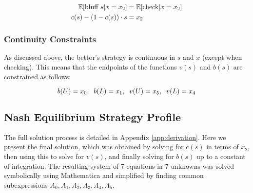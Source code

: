 \documentclass[../../main/main.tex]{subfiles}
\begin{document}
\begin{align}{\label{bluffindiff}}
    \nonumber \mathbb{E}[\text{bluff } s | x=x_2] & = \mathbb{E}[\text{check} | x=x_2]\\ 
    c(s) - (1-c(s)) \cdot s & = x_2
\end{align}

\subsubsection{Continuity Constraints}

As discussed above, the bettor's strategy is continuous in $s$ and $x$ (except when checking). This means that the endpoints of the functions $v(s)$ and $b(s)$ are constrained as follows:

\begin{equation}{\label{continuityconstraints}}
	 b(U) = x_0, \;\; b(L) = x_1, \;\; v(U) = x_5, \;\; v(L) = x_4
\end{equation}

\subsection{Nash Equilibrium Strategy Profile}


The full solution process is detailed in Appendix \ref{app:derivation}. Here we present the final solution, which was obtained by solving for $c(s)$ in terms of $x_2$, then using this to solve for $v(s)$, and finally solving for $b(s)$ up to a constant of integration. The resulting system of 7 equations in 7 unknowns was solved symbolically using Mathematica and simplified by finding common subexpressions $A_0, A_1, A_2, A_3, A_4, A_5$. 
\end{document}
